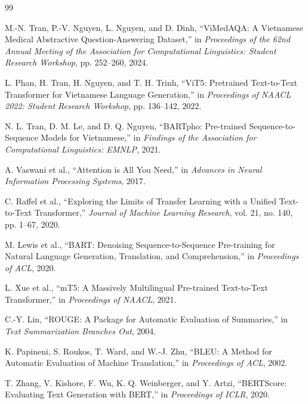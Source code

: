 \newpage
\begin{thebibliography}{99}

  M.-N. Tran, P.-V. Nguyen, L. Nguyen, and D. Dinh,
  ``ViMedAQA: A Vietnamese Medical Abstractive Question-Answering Dataset,''
  in \textit{Proceedings of the 62nd Annual Meeting of the Association for Computational Linguistics: Student Research Workshop}, pp. 252--260, 2024.

  L. Phan, H. Tran, H. Nguyen, and T. H. Trinh,
  ``ViT5: Pretrained Text-to-Text Transformer for Vietnamese Language Generation,''
  in \textit{Proceedings of NAACL 2022: Student Research Workshop}, pp. 136--142, 2022.

  N. L. Tran, D. M. Le, and D. Q. Nguyen,
  ``BARTpho: Pre-trained Sequence-to-Sequence Models for Vietnamese,''
  in \textit{Findings of the Association for Computational Linguistics: EMNLP}, 2021.

  A. Vaswani et al.,
  ``Attention is All You Need,''
  in \textit{Advances in Neural Information Processing Systems}, 2017.

  C. Raffel et al.,
  ``Exploring the Limits of Transfer Learning with a Unified Text-to-Text Transformer,''
  \textit{Journal of Machine Learning Research}, vol. 21, no. 140, pp. 1--67, 2020.

  M. Lewis et al.,
  ``BART: Denoising Sequence-to-Sequence Pre-training for Natural Language Generation, Translation, and Comprehension,''
  in \textit{Proceedings of ACL}, 2020.

  L. Xue et al.,
  ``mT5: A Massively Multilingual Pre-trained Text-to-Text Transformer,''
  in \textit{Proceedings of NAACL}, 2021.

  C.-Y. Lin,
  ``ROUGE: A Package for Automatic Evaluation of Summaries,''
  in \textit{Text Summarization Branches Out}, 2004.

  K. Papineni, S. Roukos, T. Ward, and W.-J. Zhu,
  ``BLEU: A Method for Automatic Evaluation of Machine Translation,''
  in \textit{Proceedings of ACL}, 2002.

  T. Zhang, V. Kishore, F. Wu, K. Q. Weinberger, and Y. Artzi,
  ``BERTScore: Evaluating Text Generation with BERT,''
  in \textit{Proceedings of ICLR}, 2020.

\end{thebibliography}